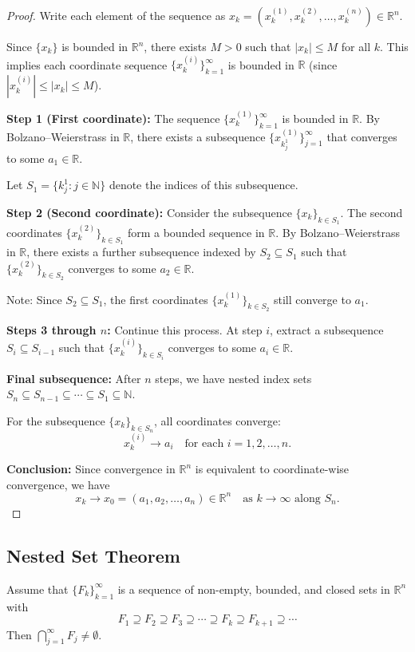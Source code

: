 \documentclass[11pt]{report}
\begin{document}
\begin{proof}
Write each element of the sequence as $x_k = (x_k^{(1)}, x_k^{(2)}, \ldots, x_k^{(n)}) \in \mathbb{R}^n$.

Since $\{x_k\}$ is bounded in $\mathbb{R}^n$, there exists $M > 0$ such that $|x_k| \leq M$ for all $k$. This implies each coordinate sequence $\{x_k^{(i)}\}_{k=1}^\infty$ is bounded in $\mathbb{R}$ (since $|x_k^{(i)}| \leq |x_k| \leq M$).

\textbf{Step 1 (First coordinate):} The sequence $\{x_k^{(1)}\}_{k=1}^\infty$ is bounded in $\mathbb{R}$. By Bolzano--Weierstrass in $\mathbb{R}$, there exists a subsequence $\{x_{k_j^1}^{(1)}\}_{j=1}^\infty$ that converges to some $a_1 \in \mathbb{R}$.

Let $S_1 = \{k_j^1 : j \in \mathbb{N}\}$ denote the indices of this subsequence.

\textbf{Step 2 (Second coordinate):} Consider the subsequence $\{x_k\}_{k \in S_1}$. The second coordinates $\{x_k^{(2)}\}_{k \in S_1}$ form a bounded sequence in $\mathbb{R}$. By Bolzano--Weierstrass in $\mathbb{R}$, there exists a further subsequence indexed by $S_2 \subseteq S_1$ such that $\{x_k^{(2)}\}_{k \in S_2}$ converges to some $a_2 \in \mathbb{R}$.

Note: Since $S_2 \subseteq S_1$, the first coordinates $\{x_k^{(1)}\}_{k \in S_2}$ still converge to $a_1$.

\textbf{Steps 3 through $n$:} Continue this process. At step $i$, extract a subsequence $S_i \subseteq S_{i-1}$ such that $\{x_k^{(i)}\}_{k \in S_i}$ converges to some $a_i \in \mathbb{R}$.

\textbf{Final subsequence:} After $n$ steps, we have nested index sets $S_n \subseteq S_{n-1} \subseteq \cdots \subseteq S_1 \subseteq \mathbb{N}$.

For the subsequence $\{x_k\}_{k \in S_n}$, all coordinates converge:
\[
x_k^{(i)} \to a_i \quad \text{for each } i = 1, 2, \ldots, n.
\]

\textbf{Conclusion:} Since convergence in $\mathbb{R}^n$ is equivalent to coordinate-wise convergence, we have
\[
x_k \to x_0 = (a_1, a_2, \ldots, a_n) \in \mathbb{R}^n \quad \text{as } k \to \infty \text{ along } S_n.
\]
\end{proof}

\subsection{Nested Set Theorem}

\begin{thmbox}
Assume that $\{F_k\}_{k=1}^\infty$ is a sequence of non-empty, bounded, and closed sets in $\mathbb{R}^n$ with
\[
F_1 \supseteq F_2 \supseteq F_3 \supseteq \cdots \supseteq F_k \supseteq F_{k+1} \supseteq \cdots
\]
Then $\bigcap_{j=1}^\infty F_j \neq \emptyset$.
\end{thmbox}
\end{document}
